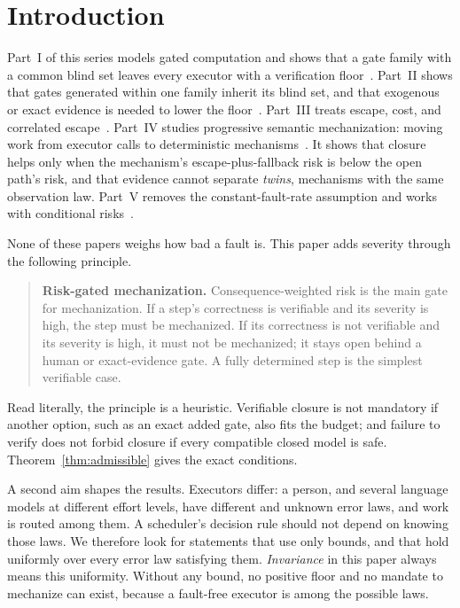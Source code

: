 \documentclass[11pt]{article}
\theoremstyle{definition}
\theoremstyle{remark}
\begin{document}
\section{Introduction}
Part~I of this series models gated computation and shows that a gate family with a common blind
set leaves every executor with a verification floor~\cite{p1}. Part~II shows that gates generated
within one family inherit its blind set, and that exogenous or exact evidence is needed to lower
the floor~\cite{p2}. Part~III treats escape, cost, and correlated escape~\cite{p3}. Part~IV studies
progressive semantic mechanization: moving work from executor calls to deterministic
mechanisms~\cite{p4}. It shows that closure helps only when the mechanism's escape-plus-fallback
risk is below the open path's risk, and that evidence cannot separate \emph{twins}, mechanisms
with the same observation law. Part~V removes the constant-fault-rate assumption and works with
conditional risks~\cite{p5}.

None of these papers weighs how bad a fault is. This paper adds severity through the following
principle.

\begin{quote}
\textbf{Risk-gated mechanization.} Consequence-weighted risk is the main gate for mechanization.
If a step's correctness is verifiable and its severity is high, the step must be mechanized. If
its correctness is not verifiable and its severity is high, it must not be mechanized; it stays
open behind a human or exact-evidence gate. A fully determined step is the simplest verifiable
case.
\end{quote}
Read literally, the principle is a heuristic. Verifiable closure is not mandatory if another option,
such as an exact added gate, also fits the budget; and failure to verify does not forbid closure if
every compatible closed model is safe. Theorem~\ref{thm:admissible} gives the exact conditions.

A second aim shapes the results. Executors differ: a person, and several language models at
different effort levels, have different and unknown error laws, and work is routed among them.
A scheduler's decision rule should not depend on knowing those laws. We therefore look for
statements that use only bounds, and that hold uniformly over every error law satisfying them.
\emph{Invariance} in this paper always means this uniformity. Without any bound, no positive floor
and no mandate to mechanize can exist, because a fault-free executor is among the possible laws.
\end{document}
